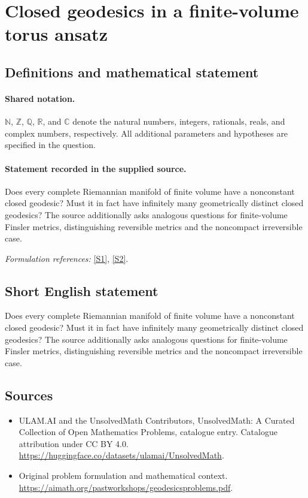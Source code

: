 \documentclass[11pt]{article}
\newcommand{\sref}[2]{\hyperlink{source:#1:#2}{[S#2]}}
\begin{document}
\section{Closed geodesics in a finite-volume torus ansatz}\label{statement}

\subsection{Definitions and mathematical statement}

\paragraph{Shared notation.}$\mathbb N$, $\mathbb Z$, $\mathbb Q$, $\mathbb R$, and $\mathbb C$ denote the natural numbers, integers, rationals, reals, and complex numbers, respectively. All additional parameters and hypotheses are specified in the question.


\paragraph{Statement recorded in the supplied source.}
Does every complete Riemannian manifold of finite volume have a nonconstant closed geodesic? Must it in fact have infinitely many geometrically distinct closed geodesics? The source additionally asks analogous questions for finite-volume Finsler metrics, distinguishing reversible metrics and the noncompact irreversible case.
\par\smallskip\textit{Formulation references:} \sref{statement}{1}, \sref{statement}{2}.
\subsection{Short English statement}
Does every complete Riemannian manifold of finite volume have a nonconstant closed geodesic? Must it in fact have infinitely many geometrically distinct closed geodesics? The source additionally asks analogous questions for finite-volume Finsler metrics, distinguishing reversible metrics and the noncompact irreversible case.
\subsection{Sources}
\begin{itemize}
\item[\hypertarget{source:statement:1}{S1}] ULAM.AI and the UnsolvedMath Contributors, UnsolvedMath: A Curated Collection of Open Mathematics Problems, catalogue entry. Catalogue attribution under CC BY 4.0.
\url{https://huggingface.co/datasets/ulamai/UnsolvedMath}.
\item[\hypertarget{source:statement:2}{S2}] Original problem formulation and mathematical context.
\url{https://aimath.org/pastworkshops/geodesicsproblems.pdf}.
\end{itemize}
\label{end:statement}
\end{document}
